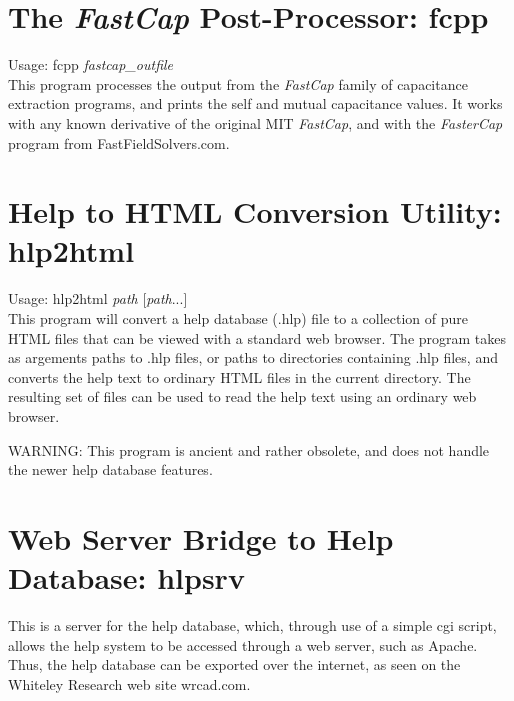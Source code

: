 \section{The {\it FastCap} Post-Processor:  {\vt fcpp}}

Usage:  {\vt fcpp} {\it fastcap\_outfile}\\

This program processes the output from the {\it FastCap} family of
capacitance extraction programs, and prints the self and mutual
capacitance values.  It works with any known derivative of the
original MIT {\it FastCap}, and with the {\it FasterCap} program from
{\vt FastFieldSolvers.com}.


\section{Help to HTML Conversion Utility:  {\vt hlp2html}}

Usage: {\vt hlp2html} {\it path} [{\it path\/}...]\\

This program will convert a help database ({\vt .hlp}) file to a
collection of pure HTML files that can be viewed with a standard web
browser.  The program takes as argements paths to {\vt .hlp} files, or
paths to directories containing {\vt .hlp} files, and converts the
help text to ordinary HTML files in the current directory.  The
resulting set of files can be used to read the help text using an
ordinary web browser.

WARNING:  This program is ancient and rather obsolete, and does not
handle the newer help database features.


\section{Web Server Bridge to Help Database:  {\vt hlpsrv}}

This is a server for the help database, which, through use of a simple
cgi script, allows the help system to be accessed through a web
server, such as Apache.  Thus, the help database can be exported over
the internet, as seen on the Whiteley Research web site {\vt
wrcad.com}.

